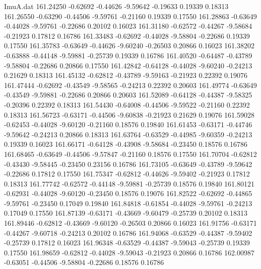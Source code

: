 \begin{filecontents}{ImuA.dat}
 161.24250   -0.62692   -0.44626   -9.59642   -0.19633    0.19339    0.18313
 161.26550   -0.63290   -0.44506   -9.59761   -0.21160    0.19339    0.17550
 161.28863   -0.63649   -0.44028   -9.59761   -0.22686    0.20102    0.16023
 161.31180   -0.62572   -0.44267   -9.58684   -0.21923    0.17812    0.16786
 161.33483   -0.62692   -0.44028   -9.58804   -0.22686    0.19339    0.17550
 161.35783   -0.63649   -0.44626   -9.60240   -0.26503    0.20866    0.16023
 161.38202   -0.63888   -0.44148   -9.59881   -0.25739    0.19339    0.16786
 161.40520   -0.64487   -0.43789   -9.58804   -0.22686    0.20866    0.17550
 161.42842   -0.64128   -0.44028   -9.60240   -0.24213    0.21629    0.18313
 161.45132   -0.62812   -0.43789   -9.59163   -0.21923    0.22392    0.19076
 161.47444   -0.62692   -0.43549   -9.58565   -0.24213    0.22392    0.20603
 161.49774   -0.63649   -0.43549   -9.59881   -0.22686    0.20866    0.20603
 161.52089   -0.64128   -0.44387   -9.58325   -0.20396    0.22392    0.18313
 161.54430   -0.64008   -0.44506   -9.59522   -0.21160    0.22392    0.18313
 161.56723   -0.63171   -0.44506   -9.60838   -0.21923    0.21629    0.19076
 161.59028   -0.62453   -0.44028   -9.60120   -0.21160    0.18576    0.19840
 161.61453   -0.63171   -0.44746   -9.59642   -0.24213    0.20866    0.18313
 161.63764   -0.63529   -0.44985   -9.60359   -0.24213    0.19339    0.16023
 161.66171   -0.64128   -0.43908   -9.58684   -0.23450    0.18576    0.16786
 161.68465   -0.63649   -0.44506   -9.57847   -0.21160    0.18576    0.17550
 161.70704   -0.62812   -0.43430   -9.58445   -0.23450    0.23156    0.16786
 161.73105   -0.63649   -0.43789   -9.59642   -0.22686    0.17812    0.17550
 161.75347   -0.62812   -0.44626   -9.59402   -0.21923    0.17812    0.18313
 161.77742   -0.62572   -0.44148   -9.59881   -0.25739    0.18576    0.19840
 161.80121   -0.62931   -0.44028   -9.60120   -0.23450    0.18576    0.19076
 161.82522   -0.62692   -0.44865   -9.59761   -0.23450    0.17049    0.19840
 161.84818   -0.61854   -0.44028   -9.59761   -0.24213    0.17049    0.17550
 161.87139   -0.63171   -0.43669   -9.60479   -0.25739    0.20102    0.18313
 161.89446   -0.62812   -0.43669   -9.60120   -0.26503    0.20866    0.16023
 161.91756   -0.63171   -0.44267   -9.60718   -0.24213    0.20102    0.16786
 161.94068   -0.63529   -0.44387   -9.59402   -0.25739    0.17812    0.16023
 161.96348   -0.63529   -0.44387   -9.59043   -0.25739    0.19339    0.17550
 161.98659   -0.62812   -0.44028   -9.59043   -0.21923    0.20866    0.16786
 162.00987   -0.63051   -0.44506   -9.58804   -0.22686    0.18576    0.16786

\end{filecontents}
